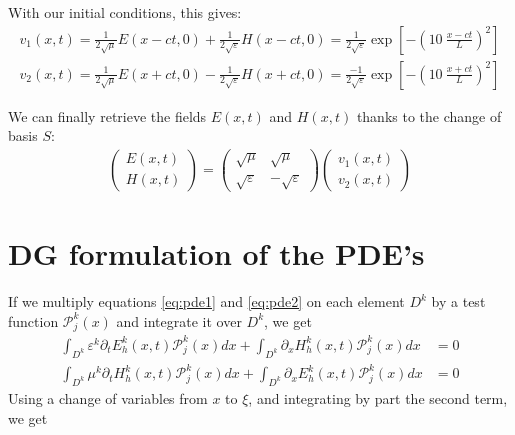 \documentclass[11 pt]{article}
\begin{document}
With our initial conditions, this gives:
\begin{align*}
    v_1(x, t) = \frac{1}{2\sqrt{\mu}} E(x-ct, 0) + \frac{1}{2\sqrt{\varepsilon}} H(x-ct, 0) = \frac{1}{2\sqrt{\varepsilon}} \exp\left[-\left(10 \:\frac{x-ct}{L}\right)^2\right]\\
    v_2(x, t) = \frac{1}{2\sqrt{\mu}} E(x+ct, 0) - \frac{1}{2\sqrt{\varepsilon}} H(x+ct, 0) = \frac{-1}{2\sqrt{\varepsilon}} \exp\left[-\left(10 \: \frac{x+ct}{L}\right)^2\right]
\end{align*}

We can finally retrieve the fields $E(x,t)$ and $H(x,t)$ thanks to the change of basis $S$:
\begin{align*}
    \begin{pmatrix}
    E(x,t) \\ H(x, t)
    \end{pmatrix} =
    \begin{pmatrix}
    \sqrt{\mu}& \sqrt{\mu} \\
    \sqrt{\varepsilon} & -\sqrt{\varepsilon}
    \end{pmatrix}
    \begin{pmatrix}
    v_1(x,t) \\ v_2(x, t)
    \end{pmatrix}
\end{align*}

\section{DG formulation of the PDE's}
If we multiply equations \eqref{eq:pde1} and \eqref{eq:pde2} on each element $D^k$ by a test function $\mathcal{P}_j^k(x)$ and integrate it over $D^k$, we get
{\small
\begin{align*}
    \int_{D^k} \varepsilon^k \partial_t E_h^k(x,t) \mathcal{P}_j^k(x) dx + \int_{D^k} \partial_x H_h^k(x,t) \mathcal{P}_j^k(x) dx &= 0 \\[2pt]
    \int_{D^k} \mu^k \partial_t H_h^k(x,t) \mathcal{P}_j^k(x) dx + \int_{D^k} \partial_x E_h^k(x,t) \mathcal{P}_j^k(x) dx &= 0
\end{align*}
}
Using a change of variables from $x$ to $\xi$, and integrating by part the second term, we get
\end{document}
